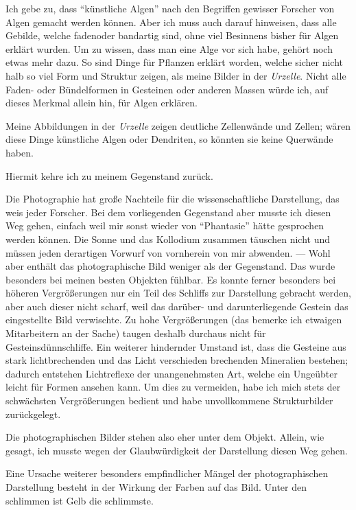 \documentclass[a4paper, 12pt, oneside]{article}
\begin{document}
Ich gebe zu, dass "`künstliche Algen"' nach den Begriffen gewisser Forscher von Algen gemacht werden können. Aber ich muss auch darauf hinweisen, dass alle Gebilde, welche fadenoder bandartig sind, ohne viel Besinnens bisher für Algen erklärt wurden. Um zu wissen, dass man eine Alge vor sich habe, gehört noch etwas mehr dazu. So sind Dinge für Pflanzen erklärt worden, welche sicher nicht halb so viel Form und Struktur zeigen, als meine Bilder in der \emph{Urzelle}. Nicht alle Faden- oder Bündelformen in Gesteinen oder anderen Massen würde ich, auf dieses Merkmal allein hin, für Algen erklären.

Meine Abbildungen in der \emph{Urzelle} zeigen deutliche Zellenwände und Zellen; wären diese Dinge künstliche Algen oder Dendriten, so könnten sie keine Querwände haben.

Hiermit kehre ich zu meinem Gegenstand zurück.

Die Photographie hat große Nachteile für die wissenschaftliche Darstellung, das weis jeder Forscher. Bei dem vorliegenden Gegenstand aber musste ich diesen Weg gehen, einfach weil mir sonst wieder von "`Phantasie"' hätte gesprochen werden können. Die Sonne und das Kollodium zusammen täuschen nicht und müssen jeden derartigen Vorwurf von vornherein von mir abwenden. — Wohl aber enthält das photographische Bild weniger als der Gegenstand. Das wurde besonders bei meinen besten Objekten fühlbar. Es konnte ferner besonders bei höheren Vergrößerungen nur ein Teil des Schliffs zur Darstellung gebracht werden, aber auch dieser nicht scharf, weil das darüber- und darunterliegende Gestein das eingestellte Bild verwischte. Zu hohe Vergrößerungen (das bemerke ich etwaigen Mitarbeitern an der Sache) taugen deshalb durchaus nicht für Gesteinsdünnschliffe. Ein weiterer hindernder Umstand ist, dass die Gesteine aus stark lichtbrechenden und das Licht verschieden brechenden Mineralien bestehen; dadurch entstehen Lichtreflexe der unangenehmsten Art, welche ein Ungeübter leicht für Formen ansehen kann. Um dies zu vermeiden, habe ich mich stets der schwächsten Vergrößerungen bedient und habe unvollkommene Strukturbilder zurückgelegt.

Die photographischen Bilder stehen also eher unter dem Objekt. Allein, wie gesagt, ich musste wegen der Glaubwürdigkeit der Darstellung diesen Weg gehen.

Eine Ursache weiterer besonders empfindlicher Mängel der photographischen Darstellung besteht in der Wirkung der Farben auf das Bild. Unter den schlimmen ist Gelb die schlimmste.
\end{document}
